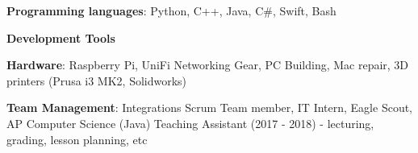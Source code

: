 

\begin{cventries}
\vspace{-5mm}
  \cventry
    {}
    {}
    {}
    {}
    {
      \begin{cvitems}
        \item {\textbf{Programming languages}: Python, C++, Java, C\#, Swift, Bash}
        \item {\textbf{Development Tools}}
        \item {\textbf{Hardware}: Raspberry Pi, UniFi Networking Gear,
            PC Building, Mac repair, 3D printers (Prusa i3 MK2,
            Solidworks)}
        \item {\textbf{Team Management}:  Integrations Scrum Team
            member, IT Intern, Eagle Scout, AP Computer Science (Java) Teaching
            Assistant (2017 - 2018) - lecturing, grading, lesson
            planning, etc}
      \end{cvitems}
    }
\end{cventries}
